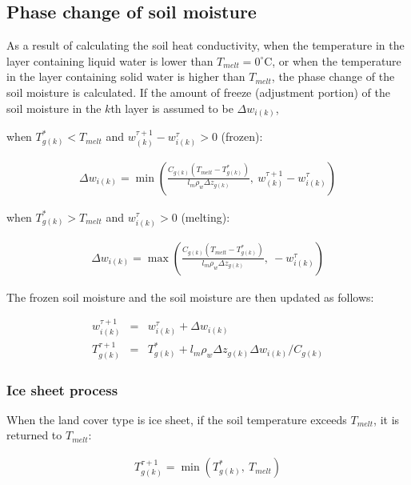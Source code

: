 \hypertarget{phase-change-of-soil-moisture}{%
\subsection{Phase change of soil moisture}\label{phase-change-of-soil-moisture}}

As a result of calculating the soil heat conductivity, when the temperature in the layer containing liquid water is lower than \(T_{melt}=0 ^{\circ}\)C, or when the temperature in the layer containing
solid water is higher than \(T_{melt}\), the phase change of the soil moisture is calculated. If the amount of freeze (adjustment portion) of the soil moisture in the \(k\)th layer is assumed to be
\(\Delta w_{i(k)}\),

when \(T_{g(k)}^\ast<T_{melt}\) and \(w_{(k)}^{\tau+1}-w_{i(k)}^{\tau}>0\) (frozen):

\begin{eqnarray}
\Delta w_{i(k)} = \min\left(
\frac{C_{g(k)}(T_{melt}-T_{g(k)}^\ast)}{l_m \rho_w \Delta z_{g(k)}}, \
w_{(k)}^{\tau+1}-w_{i(k)}^{\tau}
\right)
\end{eqnarray}

when \(T_{g(k)}^\ast>T_{melt}\) and \(w_{i(k)}^{\tau}>0\) (melting):

\begin{eqnarray}
\Delta w_{i(k)} = \max\left(
\frac{C_{g(k)}(T_{melt}-T_{g(k)}^\ast)}{l_m \rho_w \Delta z_{g(k)}}, \
-w_{i(k)}^{\tau}
\right)
\end{eqnarray}

The frozen soil moisture and the soil moisture are then updated as follows:

\begin{eqnarray}
w_{i(k)}^{\tau+1} &=& w_{i(k)}^{\tau} + \Delta w_{i(k)} \\
T_{g(k)}^{\tau+1} &=& T_{g(k)}^\ast + l_m \rho_w \Delta z_{g(k)} \Delta w_{i(k)} / C_{g(k)}
\end{eqnarray}

\hypertarget{ice-sheet-process}{%
\subsubsection{Ice sheet process}\label{ice-sheet-process}}

When the land cover type is ice sheet, if the soil temperature exceeds \(T_{melt}\), it is returned to \(T_{melt}\):

\begin{eqnarray}
 T_{g(k)}^{\tau+1} = \min( T_{g(k)}^\ast, \ T_{melt} )
\end{eqnarray}

